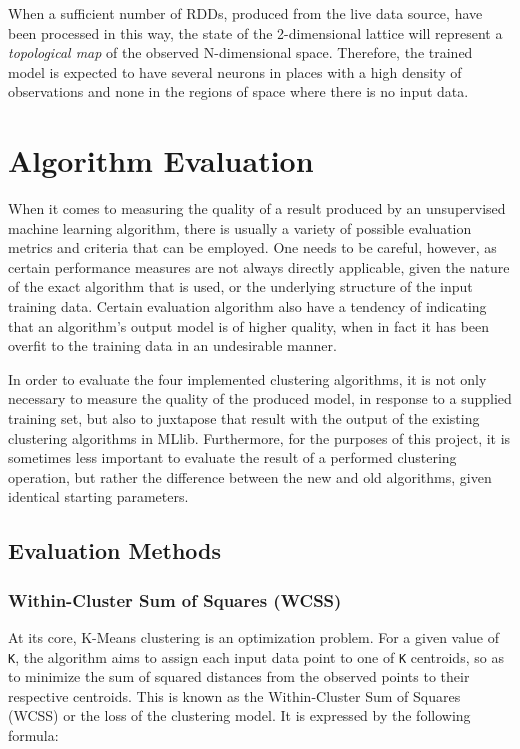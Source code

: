 \documentclass{l4proj}
\begin{document}
When a sufficient number of RDDs, produced from the live data source, have been processed in this way, the state of the 2-dimensional lattice will represent a \textit{topological map} of the observed N-dimensional space. Therefore, the trained model is expected to have several neurons in places with a high density of observations and none in the regions of space where there is no input data.


\chapter{Algorithm Evaluation}
\label{eval}

When it comes to measuring the quality of a result produced by an unsupervised machine learning algorithm, there is usually a variety of possible evaluation metrics and criteria that can be employed. One needs to be careful, however, as certain performance measures are not always directly applicable, given the nature of the exact algorithm that is used, or the underlying structure of the input training data. Certain evaluation algorithm also have a tendency of indicating that an algorithm's output model is of higher quality, when in fact it has been overfit to the training data in an undesirable manner\cite{Overfit}.

In order to evaluate the four implemented clustering algorithms, it is not only necessary to measure the quality of the produced model, in response to a supplied training set, but also to juxtapose that result with the output of the existing clustering algorithms in MLlib. Furthermore, for the purposes of this project, it is sometimes less important to evaluate the result of a performed clustering operation, but rather the difference between the new and old algorithms, given identical starting parameters. 

\section{Evaluation Methods}

\subsection{Within-Cluster Sum of Squares (WCSS)}

At its core, K-Means clustering is an optimization problem. For a given value of \texttt{K}, the algorithm aims to assign each input data point to one of \texttt{K} centroids, so as to minimize the sum of squared distances from the observed points to their respective centroids. This is known as the Within-Cluster Sum of Squares (WCSS) or the loss of the clustering model. It is expressed by the following formula:
\end{document}
